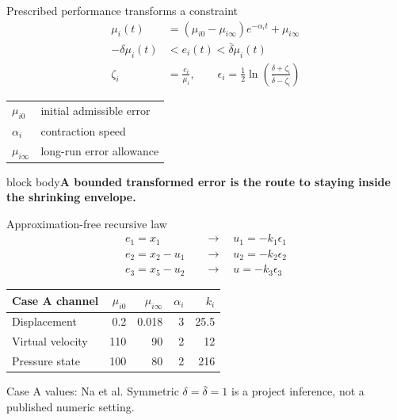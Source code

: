 \documentclass[aspectratio=169,10pt]{beamer}
\newcommand{\source}[1]{\vfill{\color{muted}\scriptsize #1}}
\newcommand{\takeaway}[1]{\vfill\begin{beamercolorbox}[wd=\linewidth,sep=1ex]{block body}\color{accent}\bfseries #1\end{beamercolorbox}}
\begin{document}
\begin{frame}{Prescribed performance transforms a constraint}
\vspace{0.25cm}
\begin{align*}
\mu_i(t)&=(\mu_{i0}-\mu_{i\infty})e^{-\alpha_i t}+\mu_{i\infty}\\[0.35em]
-\delta\mu_i(t)&<e_i(t)<\bar\delta\mu_i(t)\\[0.35em]
\zeta_i&=\frac{e_i}{\mu_i},\qquad
\epsilon_i=\frac12\ln\!\left(\frac{\delta+\zeta_i}{\bar\delta-\zeta_i}\right)
\end{align*}
\vspace{0.35cm}
\begin{tabularx}{\linewidth}{@{}lX@{}}
\toprule
\(\mu_{i0}\) & initial admissible error\\
\(\alpha_i\) & contraction speed\\
\(\mu_{i\infty}\) & long-run error allowance\\
\bottomrule
\end{tabularx}
\takeaway{A bounded transformed error is the route to staying inside the shrinking envelope.}
\end{frame}

\begin{frame}{Approximation-free recursive law}
\vspace{0.2cm}
\begin{align*}
e_1=x_1 &\quad\longrightarrow\quad u_1=-k_1\epsilon_1\\[0.45em]
e_2=x_2-u_1 &\quad\longrightarrow\quad u_2=-k_2\epsilon_2\\[0.45em]
e_3=x_5-u_2 &\quad\longrightarrow\quad u=-k_3\epsilon_3
\end{align*}
\vspace{0.5cm}
\centering
\begin{tabular}{@{}lrrrr@{}}
\toprule
Case A channel & \(\mu_{i0}\) & \(\mu_{i\infty}\) & \(\alpha_i\) & \(k_i\)\\
\midrule
Displacement & 0.2 & 0.018 & 3 & 25.5\\
Virtual velocity & 110 & 90 & 2 & 12\\
Pressure state & 100 & 80 & 2 & 216\\
\bottomrule
\end{tabular}
\source{Case A values: Na et al. Symmetric \(\delta=\bar\delta=1\) is a project inference, not a published numeric setting.}
\end{frame}
\end{document}
